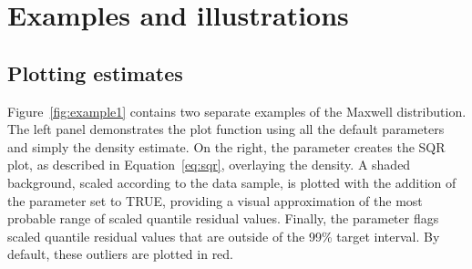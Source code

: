 \section{Examples and illustrations} \label{sec:examples}

\subsection{Plotting estimates} \label{plot}

Figure~\ref{fig:example1} contains two separate examples of the Maxwell distribution.  The left panel demonstrates the plot function using all the default parameters and simply  the density estimate.  On the right, the  parameter creates the SQR plot, as described in Equation~\ref{eq:sqr}, overlaying the density.  A shaded background, scaled according to the data sample, is plotted with the addition of the  parameter set to TRUE, providing a visual approximation of the most probable range of scaled quantile residual values.  Finally, the  parameter flags scaled quantile residual values that are outside of the 99\% target interval.  By default, these outliers are plotted in red.

